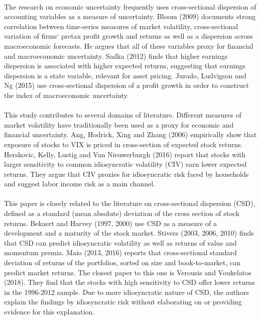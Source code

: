 \documentclass[12pt]{article}
\begin{document}
\paragraph{}
The research on economic uncertainty frequently uses cross-sectional dispersion of accounting variables as a measure of uncertainty. Bloom (2009) documents strong correlation between time-series measures of market volatility, cross-sectional variation of firms` pretax profit growth and returns as well as a dispersion across macroeconomic forecasts. He argues that all of these variables proxy for financial and macroeconomic uncertainty. Sadka (2012) finds that higher earnings dispersion is associated with higher expected returns, suggesting that earnings dispersion is a state variable, relevant for asset pricing. Jurado, Ludvigson and Ng (2015) use cross-sectional dispersion of a profit growth in order to construct the index of macroeconomic uncertainty.
\paragraph{}
This study contributes to several domains of literature. Different measures of market volatility have traditionally been used as a proxy for economic and financial uncertainty. Ang, Hodrick, Xing and Zhang (2006) empirically show that exposure of stocks to VIX is priced in cross-section of expected stock returns. Herskovic, Kelly, Lustig and Van Nieuwerburgh (2016) report that stocks with larger sensitivity to common idiosyncratic volatility (CIV) earn lower expected returns. They argue that CIV proxies for idiosyncratic risk faced by households and suggest labor income risk as a main channel.
\paragraph{}
This paper is closely related to the literature on cross-sectional dispersion (CSD), defined as a standard (mean absolute) deviation of the cross section of stock returns. Bekaert and Harvey (1997, 2000) use CSD as a measure of a development and a maturity of the stock market. Stivers (2003, 2006, 2010) finds that CSD can predict idiosyncratic volatility as well as returns of value and momentum premia. Maio (2013, 2016) reports that cross-sectional standard deviation of returns of the portfolios, sorted on size and book-to-market, can predict market returns. The closest paper to this one is Verousis and Voukelatos (2018). They find that the stocks with high sensitivity to CSD offer lower returns in the 1996-2012 sample. Due to more idiosyncratic nature of CSD, the authors explain the findings by idiosyncratic risk without elaborating on or providing evidence for this explanation.
\end{document}

